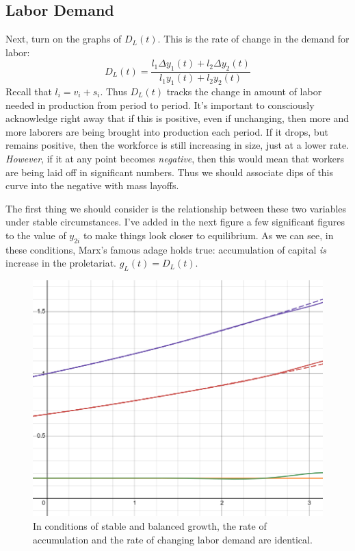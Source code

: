 \documentclass{article}
\theoremstyle{theorem}
\begin{document}
\subsection{Labor Demand}
Next, turn on the graphs of $D_L(t)$. This is the rate of change in the demand for labor:
\[ D_L(t) = \frac{l_1\Delta y_1(t)+l_2 \Delta y_2(t)}{l_1y_1(t) + l_2y_2(t)} \]
Recall that $l_i = v_i + s_i$. Thus $D_L(t)$ tracks the change in amount of labor needed in production from period to period. It's important to consciously acknowledge right away that if this is positive, even if unchanging, then more and more laborers are being brought into production each period. If it drops, but remains positive, then the workforce is still increasing in size, just at a lower rate. \emph{However}, if it at any point becomes \emph{negative}, then this would mean that workers are being laid off in significant numbers. Thus we should associate dips of this curve into the negative with mass layoffs. \par 
The first thing we should consider is the relationship between these two variables under stable circumstances. I've added in the next figure a few significant figures to the value of $y_{2i}$ to make things look closer to equilibrium. As we can see, in these conditions, Marx's famous adage holds true: accumulation of capital \emph{is} increase in the proletariat. $g_L(t) = D_L(t)$. 
\begin{figure}[H]
\centering
\includegraphics[scale=.7]{Images/accumulationOfProles}
\caption{In conditions of stable and balanced growth, the rate of accumulation and the rate of changing labor demand are identical.}
\end{figure}
\end{document}
